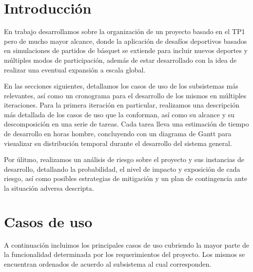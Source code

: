 \documentclass[a4paper, 10pt, twoside]{article}
\begin{document}
\newpage

\tableofcontents

\newpage



\section{Introducción}

En trabajo desarrollamos sobre la organización de un proyecto basado en el TP1 pero de mucho mayor alcance, donde la aplicación de desafíos deportivos basados en simulaciones de partidos de básquet se extiende para incluir nuevos deportes y múltiples modos de participación, además de estar desarrollado con la idea de realizar una eventual expansión a escala global.

En las secciones siguientes, detallamos los casos de uso de los subsistemas más relevantes, así como un cronograma para el desarrollo de los mismos en múltiples iteraciones. Para la primera iteración en particular, realizamos una descripción más detallada de los casos de uso que la conforman, así como su alcance y su descomposición en una serie de tareas. Cada tarea lleva una estimación de tiempo de desarrollo en horas hombre, concluyendo con un diagrama de Gantt para visualizar su distribución temporal durante el desarrollo del sistema general.

Por úlitmo, realizamos un análisis de riesgo sobre el proyecto y sus instancias de desarrollo, detallando la probabilidad, el nivel de impacto y exposición de cada riesgo, así como posibles estrategias de mitigación y un plan de contingencia ante la situación adversa descripta.

\newpage


\section{Casos de uso}

A continuación incluimos los principales casos de uso cubriendo la mayor parte de la funcionalidad determinada por los requerimientos del proyecto. Los mismos se encuentran ordenados de acuerdo al subsistema al cual corresponden.
\end{document}
